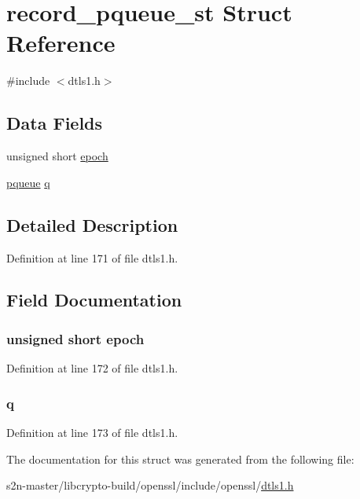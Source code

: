 \hypertarget{structrecord__pqueue__st}{}\section{record\+\_\+pqueue\+\_\+st Struct Reference}
\label{structrecord__pqueue__st}


{\ttfamily \#include $<$dtls1.\+h$>$}

\subsection*{Data Fields}
\begin{DoxyCompactItemize}
\item 
unsigned short \hyperlink{structrecord__pqueue__st_a4675237d0516bb5e6482bcc153326f91}{epoch}
\item 
\hyperlink{crypto_2pqueue_2pqueue_8h_a9e7788165522481521851e337ac42054}{pqueue} \hyperlink{structrecord__pqueue__st_ae40177c7c61ca841e28a52fd5d15c776}{q}
\end{DoxyCompactItemize}


\subsection{Detailed Description}


Definition at line 171 of file dtls1.\+h.



\subsection{Field Documentation}
\subsubsection[{\texorpdfstring{epoch}{epoch}}]{\setlength{\rightskip}{0pt plus 5cm}unsigned short epoch}\hypertarget{structrecord__pqueue__st_a4675237d0516bb5e6482bcc153326f91}{}\label{structrecord__pqueue__st_a4675237d0516bb5e6482bcc153326f91}


Definition at line 172 of file dtls1.\+h.

\subsubsection[{\texorpdfstring{q}{q}}]{ q}\hypertarget{structrecord__pqueue__st_ae40177c7c61ca841e28a52fd5d15c776}{}\label{structrecord__pqueue__st_ae40177c7c61ca841e28a52fd5d15c776}


Definition at line 173 of file dtls1.\+h.



The documentation for this struct was generated from the following file\+:\begin{DoxyCompactItemize}
\item 
s2n-\/master/libcrypto-\/build/openssl/include/openssl/\hyperlink{include_2openssl_2dtls1_8h}{dtls1.\+h}\end{DoxyCompactItemize}
